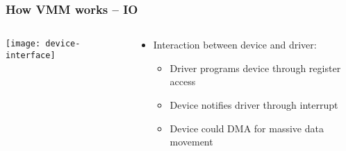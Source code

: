 \begin{frame}[plain]
	\frametitle{How VMM works -- IO}
	
	
	
	\begin{columns}
		
		\begin{column}{.4\textwidth}
			\centering
			\texttt{[image: device-interface]}
			
		\end{column}
		
		\begin{column}{.6\textwidth}
			
		\begin{itemize}
			\item Interaction between device and driver:
			\begin{itemize}
				\item Driver programs device through register access 
				\item Device notifies driver through interrupt
				\item Device could DMA for massive data movement
				
			\end{itemize} 
		
	  \end{itemize} 	
			
			
		\end{column}
		
		
	\end{columns}
	
	
\end{frame}


